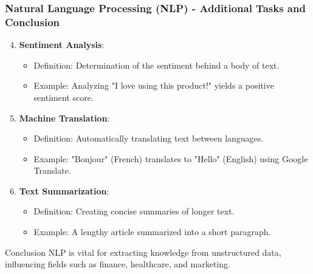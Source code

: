 \documentclass[aspectratio=169]{beamer}
\begin{document}
\begin{frame}[fragile]
    \frametitle{Natural Language Processing (NLP) - Additional Tasks and Conclusion}
    \begin{enumerate}
        \setcounter{enumi}{3}
        \item \textbf{Sentiment Analysis}:
            \begin{itemize}
                \item Definition: Determination of the sentiment behind a body of text.
                \item Example: Analyzing "I love using this product!" yields a positive sentiment score.
            \end{itemize}
        
        \item \textbf{Machine Translation}:
            \begin{itemize}
                \item Definition: Automatically translating text between languages.
                \item Example: "Bonjour" (French) translates to "Hello" (English) using Google Translate.
            \end{itemize}
        
        \item \textbf{Text Summarization}:
            \begin{itemize}
                \item Definition: Creating concise summaries of longer text.
                \item Example: A lengthy article summarized into a short paragraph.
            \end{itemize}
    \end{enumerate}
    
    \begin{block}{Conclusion}
        NLP is vital for extracting knowledge from unstructured data, influencing fields such as finance, healthcare, and marketing.
    \end{block}
\end{frame}
\end{document}
